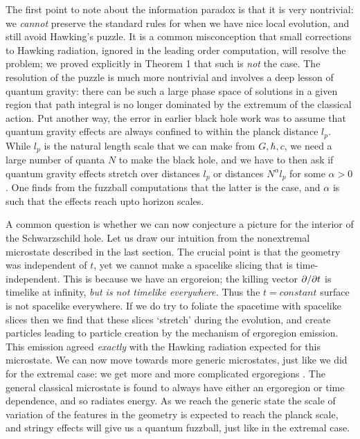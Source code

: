 \documentclass[12pt]{article}
\begin{document}
The first point to note about the information paradox is that it is very nontrivial: we {\it cannot} preserve the standard rules for when we have nice local evolution, and still avoid Hawking's puzzle. It is a common misconception that small corrections to Hawking radiation, ignored in the leading order computation, will resolve the problem; we proved explicitly in Theorem 1 that such is {\it not} the case. The resolution of the puzzle is much more nontrivial and involves a deep lesson of quantum gravity: there can be such a large phase space of solutions in a given region that path integral is no longer dominated by the extremum of the classical action. Put another way, the error in earlier black hole work was to assume that quantum gravity effects are always confined to within the planck distance $l_p$. While $l_p$ is the natural length scale that we can make from $G , \hbar, c$, we need a large number of quanta $N$ to make the black hole, and we  have to then ask if quantum gravity effects stretch over distances $l_p$ or distances $N^\alpha l_p$ for some $\alpha>0$. One finds from the fuzzball computations that the latter is the case, and $\alpha$ is such that the effects reach upto horizon scales.

A common question is whether we can now conjecture a picture for the interior of the Schwarzschild hole. Let us draw our intuition from the nonextremal microstate
described in the last section. The crucial point is that the  geometry was independent of $t$, yet we cannot make a spacelike slicing that is time-independent. This is because we have an ergoreion; the killing vector $\partial/\partial t$ is timelike at infinity, {\it but is not timelike everywhere.} Thus the $t=constant$ surface is not spacelike everywhere.  If we do try to foliate the spacetime with spacelike slices then we find that these slices `stretch' during the evolution, and create particles leading to particle creation by the mechanism of ergoregion emission. This emission agreed {\it exactly} with the Hawking radiation expected for this microstate. We can now move towards more  generic microstates, just like we did for the extremal case: we get more and more complicated ergoregions \cite{cm2}. 
The general classical microstate is found to always have either an ergoregion or time dependence, and so radiates energy. As we reach the generic state the scale of variation of the features in the geometry is expected to reach the planck scale, and stringy effects will give us a quantum fuzzball, just like in the extremal case. 
\end{document}
